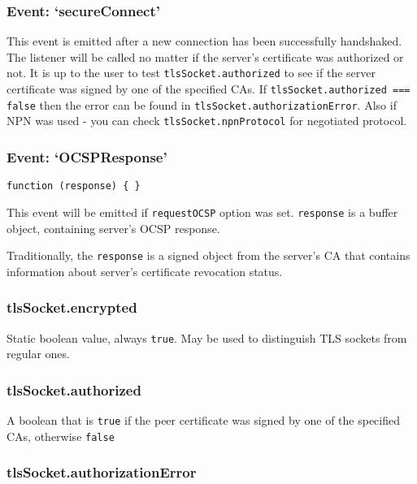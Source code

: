 \subsubsection{Event: `secureConnect'}\label{event-secureconnect}

This event is emitted after a new connection has been successfully
handshaked. The listener will be called no matter if the server's
certificate was authorized or not. It is up to the user to test
\texttt{tlsSocket.authorized} to see if the server certificate was
signed by one of the specified CAs. If
\texttt{tlsSocket.authorized === false} then the error can be found in
\texttt{tlsSocket.authorizationError}. Also if NPN was used - you can
check \texttt{tlsSocket.npnProtocol} for negotiated protocol.

\subsubsection{Event: `OCSPResponse'}\label{event-ocspresponse}

\texttt{function (response) \{ \}}

This event will be emitted if \texttt{requestOCSP} option was set.
\texttt{response} is a buffer object, containing server's OCSP response.

Traditionally, the \texttt{response} is a signed object from the
server's CA that contains information about server's certificate
revocation status.

\subsubsection{tlsSocket.encrypted}\label{tlssocket.encrypted}

Static boolean value, always \texttt{true}. May be used to distinguish
TLS sockets from regular ones.

\subsubsection{tlsSocket.authorized}\label{tlssocket.authorized}

A boolean that is \texttt{true} if the peer certificate was signed by
one of the specified CAs, otherwise \texttt{false}

\subsubsection{tlsSocket.authorizationError}\label{tlssocket.authorizationerror}


